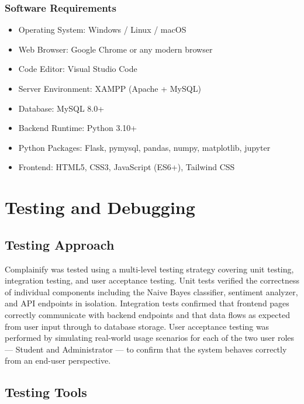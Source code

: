 \documentclass[12pt,a4paper]{report}
\begin{document}
\subsection{Software Requirements}
\begin{itemize}[nolistsep]
    \item Operating System: Windows / Linux / macOS
    \item Web Browser: Google Chrome or any modern browser
    \item Code Editor: Visual Studio Code
    \item Server Environment: XAMPP (Apache + MySQL)
    \item Database: MySQL 8.0+
    \item Backend Runtime: Python 3.10+
    \item Python Packages: Flask, pymysql, pandas, numpy, matplotlib, jupyter
    \item Frontend: HTML5, CSS3, JavaScript (ES6+), Tailwind CSS
\end{itemize}

\chapter{Testing and Debugging}

\section{Testing Approach}
Complainify was tested using a multi-level testing strategy covering unit testing, integration testing, and user acceptance testing. Unit tests verified the correctness of individual components including the Naive Bayes classifier, sentiment analyzer, and API endpoints in isolation. Integration tests confirmed that frontend pages correctly communicate with backend endpoints and that data flows as expected from user input through to database storage. User acceptance testing was performed by simulating real-world usage scenarios for each of the two user roles — Student and Administrator — to confirm that the system behaves correctly from an end-user perspective.

\section{Testing Tools}
\end{document}
